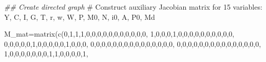 \documentclass[
  letterpaper,
  DIV=11,
  numbers=noendperiod]{scrreprt}
\newenvironment{Shaded}{\begin{snugshade}}{\end{snugshade}}
\newcommand{\CommentTok}[1]{\textcolor[rgb]{0.37,0.37,0.37}{#1}}
\newcommand{\DecValTok}[1]{\textcolor[rgb]{0.68,0.00,0.00}{#1}}
\newcommand{\DocumentationTok}[1]{\textcolor[rgb]{0.37,0.37,0.37}{\textit{#1}}}
\newcommand{\FunctionTok}[1]{\textcolor[rgb]{0.28,0.35,0.67}{#1}}
\newcommand{\NormalTok}[1]{\textcolor[rgb]{0.00,0.23,0.31}{#1}}
\newcommand{\OtherTok}[1]{\textcolor[rgb]{0.00,0.23,0.31}{#1}}
\begin{document}
\begin{Shaded}
\begin{Highlighting}[]
\DocumentationTok{\#\# Create directed graph}
\CommentTok{\# Construct auxiliary Jacobian matrix for 15 variables: Y, C, I, G, T, r, w, W, P, M0, N, i0, A, P0, Md}

\NormalTok{M\_mat}\OtherTok{=}\FunctionTok{matrix}\NormalTok{(}\FunctionTok{c}\NormalTok{(}\DecValTok{0}\NormalTok{,}\DecValTok{1}\NormalTok{,}\DecValTok{1}\NormalTok{,}\DecValTok{1}\NormalTok{,}\DecValTok{0}\NormalTok{,}\DecValTok{0}\NormalTok{,}\DecValTok{0}\NormalTok{,}\DecValTok{0}\NormalTok{,}\DecValTok{0}\NormalTok{,}\DecValTok{0}\NormalTok{,}\DecValTok{0}\NormalTok{,}\DecValTok{0}\NormalTok{,}\DecValTok{0}\NormalTok{,}\DecValTok{0}\NormalTok{,}\DecValTok{0}\NormalTok{,}
               \DecValTok{1}\NormalTok{,}\DecValTok{0}\NormalTok{,}\DecValTok{0}\NormalTok{,}\DecValTok{0}\NormalTok{,}\DecValTok{1}\NormalTok{,}\DecValTok{0}\NormalTok{,}\DecValTok{0}\NormalTok{,}\DecValTok{0}\NormalTok{,}\DecValTok{0}\NormalTok{,}\DecValTok{0}\NormalTok{,}\DecValTok{0}\NormalTok{,}\DecValTok{0}\NormalTok{,}\DecValTok{0}\NormalTok{,}\DecValTok{0}\NormalTok{,}\DecValTok{0}\NormalTok{,}
               \DecValTok{0}\NormalTok{,}\DecValTok{0}\NormalTok{,}\DecValTok{0}\NormalTok{,}\DecValTok{0}\NormalTok{,}\DecValTok{0}\NormalTok{,}\DecValTok{1}\NormalTok{,}\DecValTok{0}\NormalTok{,}\DecValTok{0}\NormalTok{,}\DecValTok{0}\NormalTok{,}\DecValTok{0}\NormalTok{,}\DecValTok{0}\NormalTok{,}\DecValTok{1}\NormalTok{,}\DecValTok{0}\NormalTok{,}\DecValTok{0}\NormalTok{,}\DecValTok{0}\NormalTok{,}
               \DecValTok{0}\NormalTok{,}\DecValTok{0}\NormalTok{,}\DecValTok{0}\NormalTok{,}\DecValTok{0}\NormalTok{,}\DecValTok{0}\NormalTok{,}\DecValTok{0}\NormalTok{,}\DecValTok{0}\NormalTok{,}\DecValTok{0}\NormalTok{,}\DecValTok{0}\NormalTok{,}\DecValTok{0}\NormalTok{,}\DecValTok{0}\NormalTok{,}\DecValTok{0}\NormalTok{,}\DecValTok{0}\NormalTok{,}\DecValTok{0}\NormalTok{,}\DecValTok{0}\NormalTok{,}
               \DecValTok{0}\NormalTok{,}\DecValTok{0}\NormalTok{,}\DecValTok{0}\NormalTok{,}\DecValTok{0}\NormalTok{,}\DecValTok{0}\NormalTok{,}\DecValTok{0}\NormalTok{,}\DecValTok{0}\NormalTok{,}\DecValTok{0}\NormalTok{,}\DecValTok{0}\NormalTok{,}\DecValTok{0}\NormalTok{,}\DecValTok{0}\NormalTok{,}\DecValTok{0}\NormalTok{,}\DecValTok{0}\NormalTok{,}\DecValTok{0}\NormalTok{,}\DecValTok{0}\NormalTok{,}
               \DecValTok{1}\NormalTok{,}\DecValTok{0}\NormalTok{,}\DecValTok{0}\NormalTok{,}\DecValTok{0}\NormalTok{,}\DecValTok{0}\NormalTok{,}\DecValTok{0}\NormalTok{,}\DecValTok{0}\NormalTok{,}\DecValTok{0}\NormalTok{,}\DecValTok{1}\NormalTok{,}\DecValTok{1}\NormalTok{,}\DecValTok{0}\NormalTok{,}\DecValTok{0}\NormalTok{,}\DecValTok{0}\NormalTok{,}\DecValTok{0}\NormalTok{,}\DecValTok{1}\NormalTok{,}

\end{Highlighting}
\end{Shaded}
\end{document}

